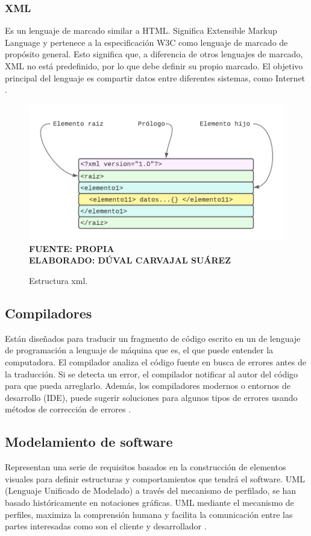 \subsubsection{XML}

Es un lenguaje de marcado similar a HTML. Significa Extensible Markup Language y pertenece a la especificación W3C como lenguaje de marcado de propósito general. Esto significa que, a diferencia de otros lenguajes de marcado, XML no está predefinido, por lo que debe definir su propio marcado. El objetivo principal del lenguaje es compartir datos entre diferentes sistemas, como Internet \cite{XML-based}.

\begin{figure}[h!]
	\caption{Estructura xml.}
	\includegraphics[width=12cm]{img/xml.png}
	\label{fig:xml}
	\textbf{\\ FUENTE: PROPIA \\ ELABORADO: DÚVAL CARVAJAL SUÁREZ}
\end{figure}

\subsection{Compiladores}
Están diseñados para traducir un fragmento de código escrito en un de lenguaje de programación a lenguaje de máquina que es, el que puede entender la computadora. El compilador analiza el código fuente en busca de errores antes de la traducción. Si se detecta un error, el compilador
notificar al autor del código para que pueda arreglarlo. Además, los compiladores modernos o entornos de desarrollo (IDE), puede sugerir soluciones para algunos tipos de errores usando métodos de corrección de errores \cite{CoEdit}.

\subsection{Modelamiento de software}
Representan una serie de requisitos basados en la construcción de elementos visuales para definir estructuras y comportamientos que tendrá el software. UML (Lenguaje Unificado de Modelado) a través del mecanismo de perfilado, se han basado históricamente en notaciones gráficas. UML mediante el mecanismo de perfiles, maximiza la comprensión humana y facilita la comunicación entre las partes interesadas como son el cliente y desarrollador \cite{Blended}. 

